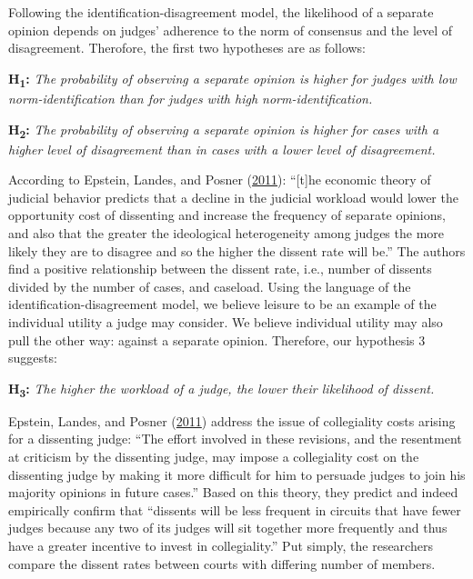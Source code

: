 \documentclass[
  11pt,
]{article}
\begin{document}
Following the identification-disagreement model, the likelihood of a
separate opinion depends on judges' adherence to the norm of consensus
and the level of disagreement. Therofore, the first two hypotheses are
as follows:

\textbf{H\textsubscript{1}:} \emph{The probability of observing a
separate opinion is higher for judges with low norm-identification than
for judges with high norm-identification.}

\textbf{H\textsubscript{2}:} \emph{The probability of observing a
separate opinion is higher for cases with a higher level of disagreement
than in cases with a lower level of disagreement.}

According to Epstein, Landes, and Posner
(\protect\hyperlink{ref-epsteinWhyWhenJudges2011}{2011}): ``{[}t{]}he
economic theory of judicial behavior predicts that a decline in the
judicial workload would lower the opportunity cost of dissenting and
increase the frequency of separate opinions, and also that the greater
the ideological heterogeneity among judges the more likely they are to
disagree and so the higher the dissent rate will be.'' The authors find
a positive relationship between the dissent rate, i.e., number of
dissents divided by the number of cases, and caseload. Using the
language of the identification-disagreement model, we believe leisure to
be an example of the individual utility a judge may consider. We believe
individual utility may also pull the other way: against a separate
opinion. Therefore, our hypothesis 3 suggests:

\textbf{H\textsubscript{3}:} \emph{The higher the workload of a judge,
the lower their likelihood of dissent.}

Epstein, Landes, and Posner
(\protect\hyperlink{ref-epsteinWhyWhenJudges2011}{2011}) address the
issue of collegiality costs arising for a dissenting judge: ``The effort
involved in these revisions, and the resentment at criticism by the
dissenting judge, may impose a collegiality cost on the dissenting judge
by making it more difficult for him to persuade judges to join his
majority opinions in future cases.'' Based on this theory, they predict
and indeed empirically confirm that ``dissents will be less frequent in
circuits that have fewer judges because any two of its judges will sit
together more frequently and thus have a greater incentive to invest in
collegiality.'' Put simply, the researchers compare the dissent rates
between courts with differing number of members.
\end{document}
